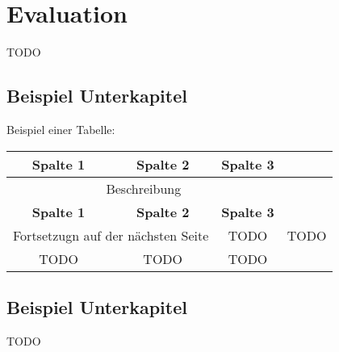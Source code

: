 \chapter{Evaluation}
\label{sec:evaluation}
TODO


\section{Beispiel Unterkapitel}
Beispiel einer Tabelle:
\begin{longtable}{|c|c|c|c|}
	\hline
	\multicolumn{1}{|c}{\textbf{Spalte 1}} &
	\multicolumn{1}{|c}{\textbf{Spalte 2}} &
	\multicolumn{1}{|c|}{\textbf{Spalte 3}} \\
	\hline
	\endfirsthead
	
	\multicolumn{3}{c}{Beschreibung}\\ \hline
	\multicolumn{1}{|c}{\textbf{Spalte 1}} &
	\multicolumn{1}{|c}{\textbf{Spalte 2}} &
	\multicolumn{1}{|c|}{\textbf{Spalte 3}} \\
	\hline
	\endhead
	
	\multicolumn{2}{c}{Fortsetzugn auf der nächsten Seite}
	\endfoot
	
	\caption{Beschreibung}
	\label{tab:example}
	\endlastfoot
	
	TODO & TODO & TODO \\ \hline
	TODO & TODO & TODO  \\ \hline
\end{longtable}

\section{Beispiel Unterkapitel}
TODO \cite{288}